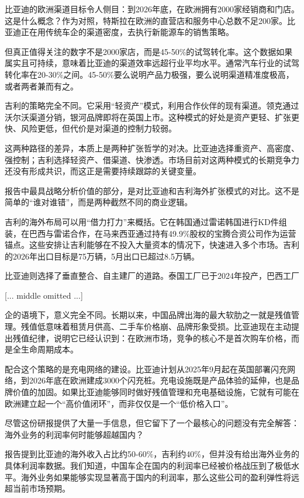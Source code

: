 \documentclass[11pt]{ctexart}
\begin{document}
比亚迪的欧洲渠道目标令人侧目：到2026年底，在欧洲拥有2000家经销商和门店。这是什么概念？作为对照，特斯拉在欧洲的直营店和服务中心总数不足200家。比亚迪正在用传统车企的渠道密度，去执行新能源车的销售策略。

但真正值得关注的数字不是2000家店，而是45-50\%的试驾转化率。这个数据如果属实且可持续，意味着比亚迪的渠道效率远超行业平均水平。通常汽车行业的试驾转化率在20-30\%之间。45-50\%要么说明产品力极强，要么说明渠道精准度极高，或者两者兼而有之。

吉利的策略完全不同。它采用“轻资产”模式，利用合作伙伴的现有渠道。领克通过沃尔沃渠道分销，银河品牌即将在英国上市。这种模式的好处是资产更轻、扩张更快、风险更低，但代价是对渠道的控制力较弱。

这两种路径的差异，本质上是两种扩张哲学的对决。比亚迪选择重资产、高密度、强控制；吉利选择轻资产、借渠道、快渗透。市场目前对这两种模式的长期竞争力还没有形成共识，而这正是需要持续跟踪的关键变量。

报告中最具战略分析价值的部分，是对比亚迪和吉利海外扩张模式的对比。这不是简单的“谁对谁错”，而是两种截然不同的商业逻辑。

吉利的海外布局可以用“借力打力”来概括。它在韩国通过雷诺韩国进行KD件组装，在巴西与雷诺合作，在马来西亚通过持有49.9\%股权的宝腾合资公司作为运营锚点。这些安排让吉利能够在不投入大量资本的情况下，快速进入多个市场。吉利的2026年出口目标是75万辆，5月出口已超过8.5万辆。

比亚迪则选择了垂直整合、自主建厂的道路。泰国工厂已于2024年投产，巴西工厂

[... middle omitted ...]

企的语境下，意义完全不同。长期以来，中国品牌出海的最大软肋之一就是残值管理。残值低意味着租赁月供高、二手车价格崩、品牌形象受损。比亚迪现在主动提出残值纪律，说明它已经认识到：在欧洲市场，竞争的核心不是首次购车价格，而是全生命周期成本。

配合这个策略的是充电网络的建设。比亚迪计划从2025年9月起在英国部署闪充网络，到2026年底在欧洲建成3000个闪充桩。充电设施既是产品体验的延伸，也是品牌价值的加固。如果比亚迪能够同时做好残值管理和充电基础设施，它就有可能在欧洲建立起一个“高价值闭环”，而非仅仅是一个“低价格入口”。

尽管这份研报提供了大量一手信息，但它留下了一个最核心的问题没有完全解答：海外业务的利润率何时能够超越国内？

报告提到比亚迪的海外收入占比约50-60\%，吉利约40\%，但并没有给出海外业务的具体利润率数据。我们知道，中国车企在国内的利润率已经被价格战压到了极低水平。海外业务如果能够实现显著高于国内的利润率，那么这些公司的盈利弹性将远超当前市场预期。
\end{document}
